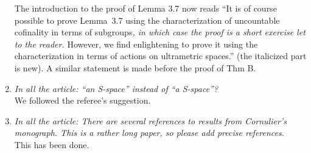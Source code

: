 \documentclass[english,a4paper]{article}
\begin{document}
\begin{enumerate}
The introduction to the proof of Lemma 3.7 now reads ``It is of course possible to prove Lemma~3.7 using the characterization of uncountable cofinality in terms of subgroups\emph{, in which case the proof is a short exercise let to the reader.} However, we find enlightening to prove it using the characterization in terms of actions on ultrametric spaces.'' (the italicized part is new).
A similar statement is made before the proof of Thm B.
%
\item\textit{In all the article: “an S-space” instead of “a S-space”?}\\
We followed the referee's suggestion.
%
\item\textit{In all the article: There are several references to results from Cornulier’s monograph. This is a rather long paper, so please add precise references.}\\
This has been done.








\end{enumerate}
\end{document}
